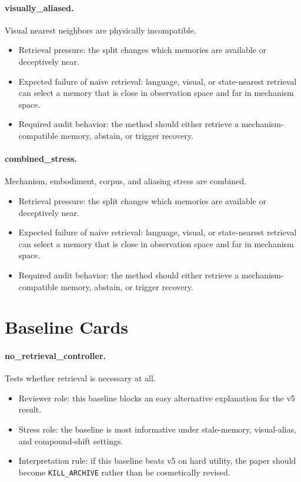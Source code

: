 \documentclass{article}
\begin{document}
\paragraph{visually\_aliased.} Visual nearest neighbors are physically incompatible.
\begin{itemize}
\item Retrieval pressure: the split changes which memories are available or deceptively near.
\item Expected failure of naive retrieval: language, visual, or state-nearest retrieval can select a memory that is close in observation space and far in mechanism space.
\item Required audit behavior: the method should either retrieve a mechanism-compatible memory, abstain, or trigger recovery.
\end{itemize}
\paragraph{combined\_stress.} Mechanism, embodiment, corpus, and aliasing stress are combined.
\begin{itemize}
\item Retrieval pressure: the split changes which memories are available or deceptively near.
\item Expected failure of naive retrieval: language, visual, or state-nearest retrieval can select a memory that is close in observation space and far in mechanism space.
\item Required audit behavior: the method should either retrieve a mechanism-compatible memory, abstain, or trigger recovery.
\end{itemize}
\clearpage
\section{Baseline Cards}
\paragraph{no\_retrieval\_controller.} Tests whether retrieval is necessary at all.
\begin{itemize}
\item Reviewer role: this baseline blocks an easy alternative explanation for the v5 result.
\item Stress role: the baseline is most informative under stale-memory, visual-alias, and compound-shift settings.
\item Interpretation rule: if this baseline beats v5 on hard utility, the paper should become \texttt{KILL\_ARCHIVE} rather than be cosmetically revised.
\end{itemize}
\end{document}
